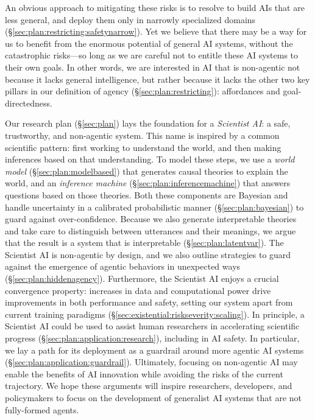 An obvious approach to mitigating these risks is to resolve to build AIs that are less general, and deploy them only in narrowly specialized domains (\S\ref{sec:plan:restricting:safetynarrow}).
Yet we believe that there may be a way for us to benefit from the enormous potential of general AI systems, without the catastrophic risks---so long as we are careful not to entitle these AI systems to their own goals. 
In other words, we are interested in AI that is non-agentic not because it lacks general intelligence, but rather because it lacks the other two key pillars in our definition of agency (\S\ref{sec:plan:restricting}): affordances and goal-directedness.

Our research plan (\S\ref{sec:plan}) lays the foundation for a \emph{Scientist AI}: a safe, trustworthy, and non-agentic system. 
This name is inspired by a common scientific pattern: first working to understand the world, and then making inferences based on that understanding.
To model these steps, we use a \textit{world model} (\S\ref{sec:plan:modelbased}) that generates causal theories to explain the world, and an \textit{inference machine} (\S\ref{sec:plan:inferencemachine}) that answers questions based on those theories. Both these components are Bayesian and handle uncertainty in a calibrated probabilistic manner (\S\ref{sec:plan:bayesian}) to guard against over-confidence. 
Because we also generate interpretable theories and take care to distinguish between utterances and their meanings, we argue that the result is a system that is
interpretable (\S\ref{sec:plan:latentvar}). 
The Scientist AI is non-agentic by design, and we also outline strategies to guard against the emergence of agentic behaviors in unexpected ways (\S\ref{sec:plan:hiddenagency}). 
Furthermore, the Scientist AI enjoys a crucial convergence property: increases in data and computational power drive improvements in both performance and safety, setting our system apart from current training paradigms (\S\ref{sec:existential:riskseverity:scaling}). 
In principle, a Scientist AI could be used to assist human researchers in accelerating scientific progress (\S\ref{sec:plan:application:research}), including in AI safety. In particular, we lay a path for its deployment as a guardrail around more agentic AI systems (\S\ref{sec:plan:application:guardrail}). 
Ultimately, focusing on non-agentic AI may enable the benefits of AI innovation while avoiding the risks of the current trajectory.
We hope these arguments will inspire researchers, developers, and policymakers to  focus on the development of generalist AI systems that are not fully-formed agents.

